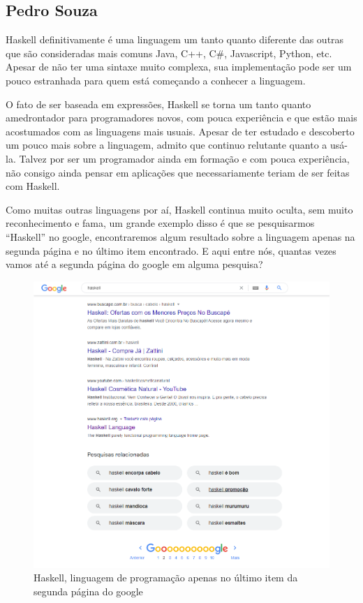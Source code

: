 \documentclass[
  12pt,				         %
  oneside,			       %
  a4paper,			       %
  english,		       	 %
  brazil,			      	 %
]{abntex2}
\begin{document}
\begin{apendicesenv}
        \newpage

        \chapter{Pedro Souza}

        Haskell definitivamente é uma linguagem um tanto quanto diferente das outras que são consideradas mais comuns Java, C++, C\#, Javascript,
        Python, etc. Apesar de não ter uma sintaxe muito complexa, sua implementação pode ser um pouco estranhada para quem está começando a conhecer
        a linguagem. 
    
        O fato de ser baseada em expressões, Haskell se torna um tanto quanto amedrontador para programadores novos, com pouca experiência e que estão
        mais acostumados com as linguagens mais usuais. Apesar de ter estudado e descoberto um pouco mais sobre a linguagem, admito que continuo 
        relutante quanto a usá-la. Talvez por ser um programador ainda em formação e com pouca experiência, não consigo ainda pensar em aplicações 
        que necessariamente teriam de ser feitas com Haskell.
    
        Como muitas outras linguagens por aí, Haskell continua muito oculta, sem muito reconhecimento e fama, um grande exemplo disso é que se pesquisarmos
        ``Haskell'' no google, encontraremos algum resultado sobre a linguagem apenas na segunda página e no último item encontrado. E aqui entre nós, quantas vezes vamos
        até a segunda página do google em alguma pesquisa?
    
        \begin{figure}[ht]
            \centering 
            \includegraphics[scale=0.3]{Haskellgoogle.png}
            \caption{Haskell, linguagem de programação apenas no último item da segunda página do google}
        \end{figure}

    \end{apendicesenv}


    \printindex
\end{document}
